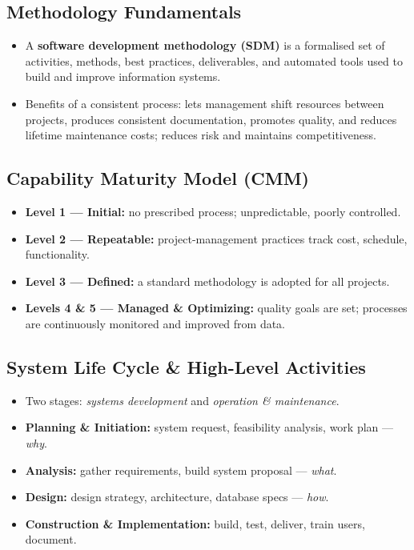 \documentclass[hidelinks]{article}
\begin{document}
\subsection{Methodology Fundamentals}
\begin{itemize}
  \item A \textbf{software development methodology (SDM)} is a formalised set of activities,
        methods, best practices, deliverables, and automated tools used to build and improve
        information systems.
  \item Benefits of a consistent process: lets management shift resources between projects,
        produces consistent documentation, promotes quality, and reduces lifetime maintenance
        costs; reduces risk and maintains competitiveness.
\end{itemize}

\subsection{Capability Maturity Model (CMM)}
\begin{itemize}
  \item \textbf{Level 1 --- Initial:} no prescribed process; unpredictable, poorly controlled.
  \item \textbf{Level 2 --- Repeatable:} project-management practices track cost, schedule, functionality.
  \item \textbf{Level 3 --- Defined:} a standard methodology is adopted for all projects.
  \item \textbf{Levels 4 \& 5 --- Managed \& Optimizing:} quality goals are set; processes are
        continuously monitored and improved from data.
\end{itemize}

\subsection{System Life Cycle \& High-Level Activities}
\begin{itemize}
  \item Two stages: \emph{systems development} and \emph{operation \& maintenance}.
  \item \textbf{Planning \& Initiation:} system request, feasibility analysis, work plan --- \emph{why}.
  \item \textbf{Analysis:} gather requirements, build system proposal --- \emph{what}.
  \item \textbf{Design:} design strategy, architecture, database specs --- \emph{how}.
  \item \textbf{Construction \& Implementation:} build, test, deliver, train users, document.
\end{itemize}
\end{document}

